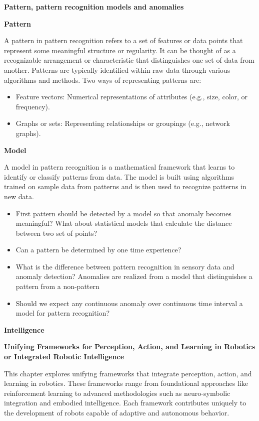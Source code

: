 \documentclass{book}
\providecommand{\ProjectDeepHeading}[2]{%
    \par\medskip\noindent\textbf{#2}\par\smallskip
}
\begin{document}
\ProjectDeepHeading{3}{Pattern, pattern recognition models and anomalies}
    \ProjectDeepHeading{4}{Pattern} A pattern in pattern recognition refers to a set of features or data points that represent some meaningful structure or regularity. It can be thought of as a recognizable arrangement or characteristic that distinguishes one set of data from another. Patterns are typically identified within raw data through various algorithms and methods. Two ways of representing patterns are:
    \begin{itemize}
        \item Feature vectors: Numerical representations of attributes (e.g., size, color, or frequency).
        \item Graphs or sets: Representing relationships or groupings (e.g., network graphs).
    \end{itemize}
    \ProjectDeepHeading{4}{Model}
    A model in pattern recognition is a mathematical framework that learns to identify or classify patterns from data. The model is built using algorithms trained on sample data from patterns and is then used to recognize patterns in new data.
    \begin{itemize}
        \item First pattern should be detected by a model so that anomaly becomes meaningful? What about statistical models that calculate the distance between two set of points?
        \item Can a pattern be determined by one time experience?
    \end{itemize}
    \begin{itemize}
        \item What is the difference between pattern recognition in sensory data and anomaly detection? Anomalies are realized from a model that distinguishes a pattern from a non-pattern
        \item Should we expect any continuous anomaly over continuous time interval a model for pattern recognition?
    \end{itemize}

\ProjectDeepHeading{1}{Intelligence}


\ProjectDeepHeading{3}{Unifying Frameworks for Perception, Action, and Learning in Robotics or Integrated Robotic Intelligence}
This chapter explores unifying frameworks that integrate perception, action, and learning in robotics. These frameworks range from foundational approaches like reinforcement learning to advanced methodologies such as neuro-symbolic integration and embodied intelligence. Each framework contributes uniquely to the development of robots capable of adaptive and autonomous behavior.
\end{document}
